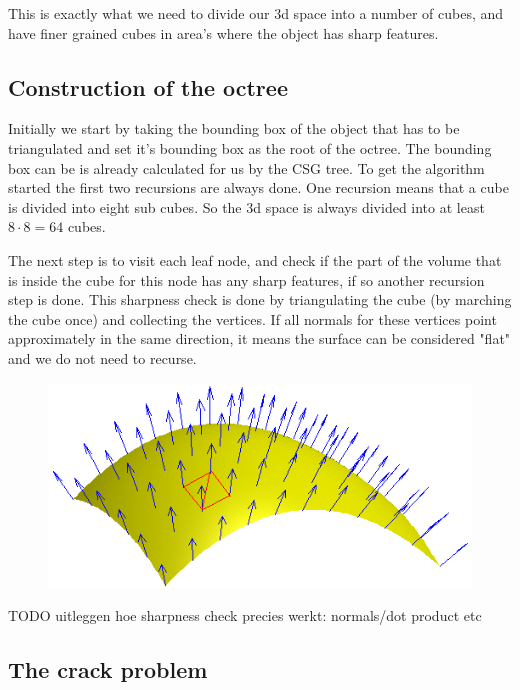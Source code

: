 \documentclass[a4paper,10pt,twoside]{report}
\begin{document}
This is exactly what we need to divide our 3d space into a number of cubes, and have finer grained cubes in area's where the object has sharp features.

\subsection{Construction of the octree}

Initially we start by taking the bounding box of the object that has to be triangulated and set it's bounding box as the root of the octree. The bounding box can be is already calculated for us by the CSG tree. To get the algorithm started the first two recursions are always done. One recursion means that a cube is divided into eight sub cubes. So the 3d space is always divided into at least $8 \cdot 8 = 64$ cubes.

The next step is to visit each leaf node, and check if the part of the volume that is inside the cube for this node has any sharp features, if so another recursion step is done. This sharpness check is done by triangulating the cube (by marching the cube once) and collecting the vertices. If all normals for these vertices point approximately in the same direction, it means the surface can be considered "flat" and we do not need to recurse.


    \begin{figure}[h]
        \begin{center}
            \includegraphics[scale=0.4]{./images/Surface_normal}
        \end{center}
        \caption{}
        \label{figure:surface_normal}
    \end{figure}

TODO uitleggen hoe sharpness check precies werkt: normals/dot product etc

\subsection{The crack problem}
\end{document}
